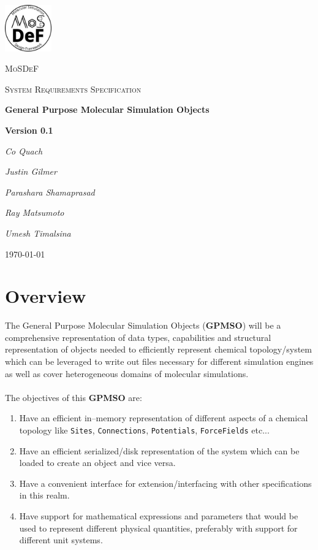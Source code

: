 \documentclass[12pt]{article}
\begin{document}
\begin{titlepage}
	\centering
	\includegraphics[width=0.15\textwidth]{docs/logo}\par\vspace{1cm}
	{\scshape\LARGE MoSDeF \par}
	\vspace{1cm}
	{\scshape\Large System Requirements Specification\par}
	\vspace{1.5cm}
	{\huge\bfseries General Purpose Molecular Simulation Objects\par}
	\vspace{1cm}
	{\huge\bfseries Version 0.1\par}
	\vspace{2cm}
	{\Large\itshape Co Quach\par}
	{\Large\itshape Justin Gilmer\par}
	{\Large\itshape Parashara Shamaprasad\par}
	{\Large\itshape Ray Matsumoto\par}
	{\Large\itshape Umesh Timalsina\par}

	\vfill

	{\large \today\par}
\end{titlepage}

{\centering \section*{Overview}}

The General Purpose Molecular Simulation Objects (\textbf{GPMSO}) will be a comprehensive representation of data types, capabilities and structural representation of objects needed to efficiently represent chemical topology/system which can be leveraged to write out files necessary for different simulation engines as well as cover heterogeneous domains of molecular simulations. \\~\\
The objectives of this \textbf{GPMSO} are:
\begin{enumerate}
    \item Have an efficient in--memory representation of different aspects of a chemical topology like \texttt{Sites}, \texttt{Connections}, \texttt{Potentials}, \texttt{ForceFields} etc...
    \item Have an efficient serialized/disk representation of the system which can be loaded to create an object and vice versa.
    \item Have a convenient interface for extension/interfacing with other specifications in this realm.
    \item Have support for mathematical expressions and parameters that would be used to represent different physical quantities, preferably with support for different unit systems.
\end{enumerate}
\end{document}
